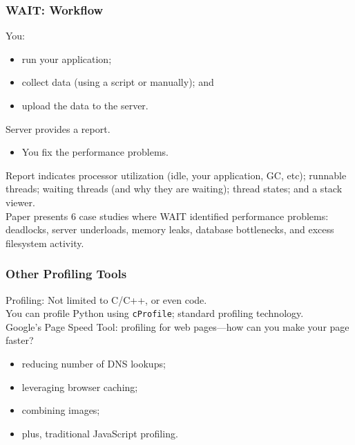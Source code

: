 \begin{frame}
  \frametitle{WAIT: Workflow}


You:
\begin{itemize}
\item run your application;
\item collect data (using a script or manually); and 
\item upload the data to the server.
\end{itemize}
Server provides
a report.\\
\begin{itemize}
\item You fix the performance problems.\\[1em]
\end{itemize}

Report indicates processor utilization (idle, your application, GC, 
etc); runnable threads; waiting threads (and why they are waiting); 
thread states; and a stack viewer.\\[1em]

Paper presents 6 case studies where WAIT identified performance
problems: deadlocks, server underloads, memory leaks, database
bottlenecks, and excess filesystem activity.


\end{frame}


\begin{frame}[fragile]
  \frametitle{Other Profiling Tools}

  
    Profiling: Not limited to C/C++, or even code.\\[1em]

    You can profile Python using {\tt cProfile}; standard profiling technology.\\[1em]

    Google's Page Speed Tool: profiling for web pages---how can you make your page faster?\\
\begin{itemize}
\item reducing number of DNS lookups;
\item leveraging browser caching;
\item combining images;
\item plus, traditional JavaScript profiling.
\end{itemize}
  
\end{frame}




